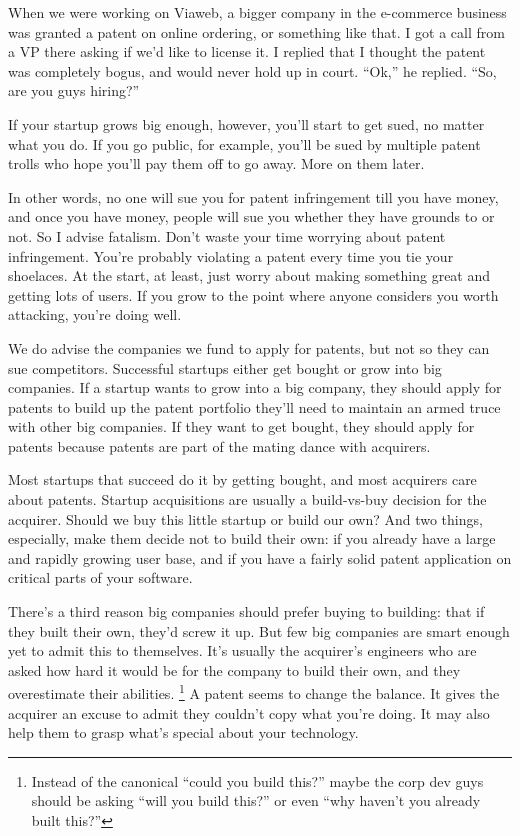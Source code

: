 When we were working on Viaweb, a bigger company in the e-commerce
business was granted a patent on online ordering, or something like
that. I got a call from a VP there asking if we'd like to license it. I
replied that I thought the patent was completely bogus, and would never
hold up in court. ``Ok,'' he replied. ``So, are you guys hiring?''

If your startup grows big enough, however, you'll start to get sued, no
matter what you do. If you go public, for example, you'll be sued by
multiple patent trolls who hope you'll pay them off to go away. More on
them later.

In other words, no one will sue you for patent infringement till you
have money, and once you have money, people will sue you whether they
have grounds to or not. So I advise fatalism. Don't waste your time
worrying about patent infringement. You're probably violating a patent
every time you tie your shoelaces. At the start, at least, just worry
about making something great and getting lots of users. If you grow to
the point where anyone considers you worth attacking, you're doing well.

We do advise the companies we fund to apply for patents, but not so they
can sue competitors. Successful startups either get bought or grow into
big companies. If a startup wants to grow into a big company, they
should apply for patents to build up the patent portfolio they'll need
to maintain an armed truce with other big companies. If they want to get
bought, they should apply for patents because patents are part of the
mating dance with acquirers.

Most startups that succeed do it by getting bought, and most acquirers
care about patents. Startup acquisitions are usually a build-vs-buy
decision for the acquirer. Should we buy this little startup or build
our own? And two things, especially, make them decide not to build their
own: if you already have a large and rapidly growing user base, and if
you have a fairly solid patent application on critical parts of your
software.

There's a third reason big companies should prefer buying to building:
that if they built their own, they'd screw it up. But few big companies
are smart enough yet to admit this to themselves. It's usually the
acquirer's engineers who are asked how hard it would be for the company
to build their own, and they overestimate their abilities.
\footnote{Instead of the canonical ``could you build this?'' maybe the
corp dev guys should be asking ``will you build this?'' or even ``why
haven't you already built this?''} A patent seems to change the balance. It gives
the acquirer an excuse to admit they couldn't copy what you're doing. It
may also help them to grasp what's special about your technology.

